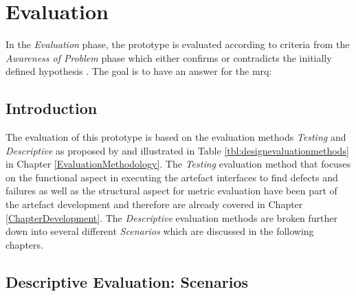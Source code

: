 
\chapter{Evaluation}

\label{ChapterEvaluation}

In the \textit{Evaluation} phase, the prototype is evaluated according to criteria from the \textit{Awareness of Problem} phase which either confirms or contradicts the initially defined hypothesis \citep{Vaishnavi2008}. The goal is to have an answer for the \gls{mrq}:
\begin{framed}
	\textit{\mrqtext}
\end{framed}


\section{Introduction}

The evaluation of this prototype is based on the evaluation methods \textit{Testing} and \textit{Descriptive} as proposed by \cite{Hevner2004} and illustrated in Table \ref{tbl:designevaluationmethods} in Chapter \ref{EvaluationMethodology}. The \textit{Testing} evaluation method that focuses on the functional aspect in executing the artefact interfaces to find defects and failures as well as the structural aspect for metric evaluation have been part of the artefact development and therefore are already covered in Chapter \ref{ChapterDevelopment}. The \textit{Descriptive} evaluation methods are broken further down into several different \textit{Scenarios} which are discussed in the following chapters.



\section{Descriptive Evaluation: Scenarios}

